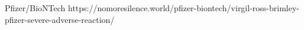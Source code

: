          {}
          {}
          {Pfizer/BioNTech}
          {}
          {
          }
          {https://nomoresilence.world/pfizer-biontech/virgil-ross-brimley-pfizer-severe-adverse-reaction/}

